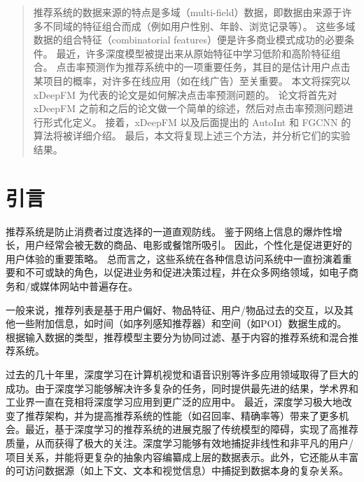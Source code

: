 \documentclass[degree=project,degree-type=project,cjk-font=noto]{thuthesis}
\begin{document}
\maketitle

\frontmatter
\begin{abstract}
  推荐系统的数据来源的特点是多域（multi-field）数据，即数据由来源于许多不同域的特征组合而成（例如用户性别、年龄、浏览记录等）。
  这些多域数据的组合特征（combinatorial features）便是许多商业模式成功的必要条件。
  最近，许多深度模型被提出来从原始特征中学习低阶和高阶特征组合。
  点击率预测作为推荐系统中的一项重要任务，其目的是估计用户点击某项目的概率，对许多在线应用（如在线广告）至关重要。
  本文将探究以 xDeepFM 为代表的论文是如何解决点击率预测问题的。
  论文将首先对 xDeepFM 之前和之后的论文做一个简单的综述，然后对点击率预测问题进行形式化定义。
  接着，xDeepFM 以及后面提出的 AutoInt 和 FGCNN 的算法将被详细介绍。
  最后，本文将复现上述三个方法，并分析它们的实验结果。

\end{abstract}


\tableofcontents

\listoffigures           %

\mainmatter

\chapter{引言}

推荐系统是防止消费者过度选择的一道直观防线。
鉴于网络上信息的爆炸性增长，用户经常会被无数的商品、电影或餐馆所吸引。
因此，个性化是促进更好的用户体验的重要策略。
总而言之，这些系统在各种信息访问系统中一直扮演着重要和不可或缺的角色，以促进业务和促进决策过程，并在众多网络领域，如电子商务和/或媒体网站中普遍存在。

一般来说，推荐列表是基于用户偏好、物品特征、用户/物品过去的交互，以及其他一些附加信息，如时间（如序列感知推荐器）和空间（如POI）数据生成的。
根据输入数据的类型，推荐模型主要分为协同过滤、基于内容的推荐系统和混合推荐系统。

过去的几十年里，深度学习在计算机视觉和语音识别等许多应用领域取得了巨大的成功。由于深度学习能够解决许多复杂的任务，同时提供最先进的结果，学术界和工业界一直在竞相将深度学习应用到更广泛的应用中。
最近，深度学习极大地改变了推荐架构，并为提高推荐系统的性能（如召回率、精确率等）带来了更多机会。最近，基于深度学习的推荐系统的进展克服了传统模型的障碍，实现了高推荐质量，从而获得了极大的关注。深度学习能够有效地捕捉非线性和非平凡的用户/项目关系，并能将更复杂的抽象内容编纂成上层的数据表示。此外，它还能从丰富的可访问数据源（如上下文、文本和视觉信息）中捕捉到数据本身的复杂关系。
\end{document}
